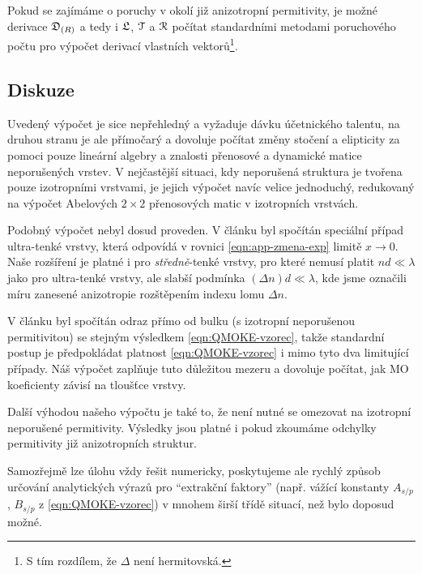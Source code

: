Pokud se zajímáme o poruchy v okolí již anizotropní permitivity, je možné derivace $\mathfrak{D}_{(R)}$ a tedy i $\mathfrak{L}$, $\mathcal{T}$ a $\mathcal{R}$ počítat standardními metodami poruchového počtu pro výpočet derivací vlastních vektorů\footnote{S tím rozdílem, že $\Delta$ není hermitovská.}.

\subsection*{Diskuze}

Uvedený výpočet je sice nepřehledný a vyžaduje dávku účetnického talentu, na druhou stranu je ale přímočarý a dovoluje počítat změny stočení a elipticity za pomoci pouze lineární algebry a znalosti přenosové a dynamické matice neporušených vrstev.
V nejčastější situaci, kdy neporušená struktura je tvořena pouze izotropními vrstvami, je jejich výpočet navíc velice jednoduchý\cite{vigoureuxPolynomialFormulationReflection1991}, redukovaný na výpočet Abelových $2\times2$ přenosových matic v izotropních vrstvách.

Podobný výpočet nebyl dosud proveden.
V článku \cite{hamrleVicinalInterfaceSensitive2003} byl spočítán speciální případ ultra-tenké vrstvy, která odpovídá v rovnici \eqref{eqn:app-zmena-exp} limitě $x\to0$. 
Naše rozšíření je platné i pro \emph{středně}-tenké vrstvy, pro které nemusí platit $nd\ll\lambda$ jako pro ultra-tenké vrstvy, ale slabší podmínka $(\Delta n)d\ll\lambda$, kde jsme označili míru zanesené anizotropie rozštěpením indexu lomu $\Delta n$.

V článku \cite{postavaAnisotropyQuadraticMagnetooptic2002} byl spočítán odraz přímo od bulku (s izotropní neporušenou permitivitou) se stejným výsledkem \eqref{eqn:QMOKE-vzorec}, takže standardní postup je předpokládat platnost \eqref{eqn:QMOKE-vzorec} i mimo tyto dva limitující případy\cite{hamrleHugeQuadraticMagnetooptical2007,kuschelVectorialMagnetometryUsing2011}.
Náš výpočet zaplňuje tuto důležitou mezeru a dovoluje počítat, jak MO koeficienty závisí na tloušťce vrstvy.

Další výhodou našeho výpočtu je také to, že není nutné se omezovat na izotropní neporušené permitivity.
Výsledky jsou platné i pokud zkoumáme odchylky permitivity již anizotropních struktur.

Samozřejmě lze úlohu vždy řešit numericky, poskytujeme ale rychlý způsob určování analytických výrazů pro ``extrakční faktory'' (např. vážící konstanty $A_{s/p}$, $B_{s/p}$ z \eqref{eqn:QMOKE-vzorec}) v mnohem širší třídě situací, než bylo doposud možné.


